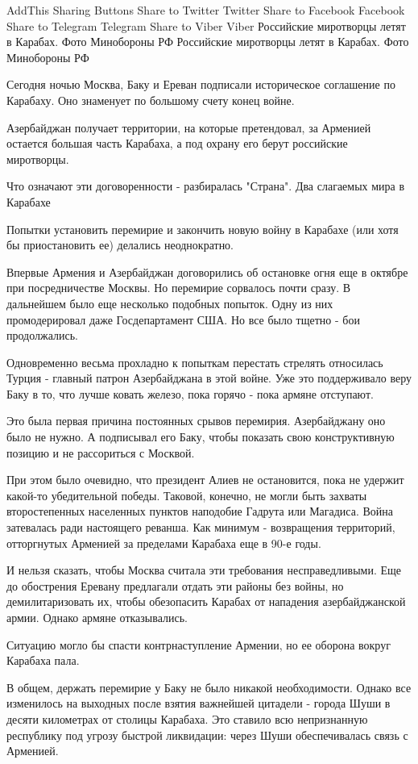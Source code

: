 AddThis Sharing Buttons
Share to Twitter
Twitter
Share to Facebook
Facebook
Share to Telegram
Telegram
Share to Viber
Viber
Российские миротворцы летят в Карабах. Фото Минобороны РФ
Российские миротворцы летят в Карабах. Фото Минобороны РФ

Сегодня ночью Москва, Баку и Ереван подписали историческое соглашение по Карабаху. Оно знаменует по большому счету конец войне.

Азербайджан получает территории, на которые претендовал, за Арменией остается большая часть Карабаха, а под охрану его берут российские миротворцы. 

Что означают эти договоренности - разбиралась "Страна". 
Два слагаемых мира в Карабахе

Попытки установить перемирие и закончить новую войну в Карабахе (или хотя бы приостановить ее) делались неоднократно.

Впервые Армения и Азербайджан договорились об остановке огня еще в октябре при посредничестве Москвы. Но перемирие сорвалось почти сразу. В дальнейшем было еще несколько подобных попыток. Одну из них промодерировал даже Госдепартамент США. Но все было тщетно - бои продолжались.

Одновременно весьма прохладно к попыткам перестать стрелять относилась Турция - главный патрон Азербайджана в этой войне. Уже это поддерживало веру Баку в то, что лучше ковать железо, пока горячо - пока армяне отступают. 

Это была первая причина постоянных срывов перемирия. Азербайджану оно было не нужно. А подписывал его Баку, чтобы показать свою конструктивную позицию и не рассориться с Москвой. 

При этом было очевидно, что президент Алиев не остановится, пока не удержит какой-то убедительной победы. Таковой, конечно, не могли быть захваты второстепенных населенных пунктов наподобие Гадрута или Магадиса. Война затевалась ради настоящего реванша. Как минимум - возвращения территорий, отторгнутых Арменией за пределами Карабаха еще в 90-е годы. 

И нельзя сказать, чтобы Москва считала эти требования несправедливыми. Еще до обострения Еревану предлагали отдать эти районы без войны, но демилитаризовать их, чтобы обезопасить Карабах от нападения азербайджанской армии. Однако армяне отказывались.

Ситуацию могло бы спасти контрнаступление Армении, но ее оборона вокруг Карабаха пала. 

В общем, держать перемирие у Баку не было никакой необходимости. Однако все изменилось на выходных после взятия важнейшей цитадели - города Шуши в десяти километрах от столицы Карабаха. Это ставило всю непризнанную республику под угрозу быстрой ликвидации: через Шуши обеспечивалась связь с Арменией. 

